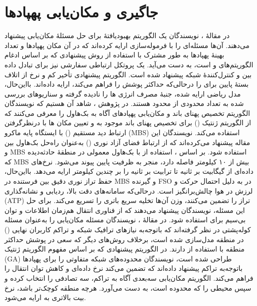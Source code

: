 \section{جاگیری و مکان‌یابی پهپادها}
در مقالهٔ \cite{Pasandideh2023}، نویسندگان یک الگوریتم بهبودیافتهٔ  برای حل مسئلهٔ مکان‌یابی پیشنهاد می‌دهند. آن‌ها مسئله‌ای را با فرموله‌سازی  ارایه کرده‌اند که در آن مکان پهپادها و تعداد بهینهٔ پهپادها به طور مشترک با استفاده از روش پیشنهادی که بر اساس ادغام الگوریتم‌های  و  است، به دست می‌آید. یک پروتکل ارتباطی سفارشی نیز برای تبادل داده بین  و کنترل‌کنندهٔ شبکه پیشنهاد شده است. الگوریتم پیشنهادی تأخیر کم و نرخ از اتلاف بستهٔ پایین برای  را درحالی‌که حداکثر پوشش  را فراهم می‌کند، ارایه داده‌اند. بااین‌حال، مدل ریاضی ارایه شده، جنبهٔ مصرف انرژی ها را نادیده گرفته و سناریوهای بررسی شده به تعداد محدودی از  محدود هستند.
در پژوهش \cite{10004755}، شاهد ‌آن هستیم که نویسندگان الگوریتم تخصیص پهنای باند و مکان‌یابی پهپادهای آگاه به بک‌هاول را معرفی می‌کنند که از الگوریتم ژنتیک () برای تخصیص پهنای باند موجود به  و تعیین مکان ها با درنظرگرفتن ارتباط دید مستقیم () با ایستگاه پایه ماکرو (\gls{MBS}) استفاده می‌کند. نویسندگان این مقاله پیشنهاد می‌کرده‌اند که از ارتباط فضای آزاد نوری () به‌عنوان راه‌حل بک‌هاول بین  و \gls{MBS} استفاده شود. بر اساس \cite{10004755}، استفاده از  با بک‌هاول معمولی در منطقهٔ حادثه‌دیده که \gls{MBS} بیش از ۱۰ کیلومتر فاصله دارد، منجر به ظرفیت پایین پیوند می‌شود.  نرخ‌های داده‌ای از گیگابیت بر ثانیه تا ترابیت بر ثانیه را بر چندین کیلومتر ارایه می‌دهد. بااین‌حال، حفظ تراز نوری دقیق بین فرستنده  در \gls{MBS} و گیرنده \gls{FSO} در  به دلیل احتمال حرکت و لرزش  در هوا چالش‌برانگیز است. درحالی‌که سامانه‌های دقت بالا، ردیابی و نشانه‌گذاری (\gls{ATP}) تراز را تضمین می‌کنند، وزن آن‌ها تخلیه سریع باتری  را تسریع می‌کند. برای حل این مسئله، نویسندگان پیشنهاد می‌دهند که از فناوری انتقال هم‌زمان اطلاعات و توان بی‌سیم برای  استفاده شود.
در مقالهٔ \cite{8642333}، نویسندگان مسئله مکان‌یابی  را به‌عنوان مسئله کوله‌پشتی در نظر گرفته‌اند که باتوجه‌به نیازهای ترافیک شبکه و تراکم کاربران نهایی () در منطقه مدل‌سازی شده است، برخلاف روش‌های دیگر که سعی در پوشش حداکثر منطقه با استفاده از  دارند. در الگوریتم پیشنهادی که بر اساس مفهوم الگوریتم ژنتیک (\gls{GA}) طراحی شده است، نویسندگان محدوده‌های شبکه متفاوتی را برای پهپادها باتوجه‌به تراکم  پیشنهاد داده‌اند که تضمین می‌کند نرخ داده‌ای و کاهش توان انتقال را فراهم می‌کند. الگوریتم مکان‌یابی سه‌بعدی  آگاه به تراکم، سه  تصادفی را انتخاب کرده و سپس محیطی را که محدوده  است، به دست می‌آورد. هرچه منطقه کوچک‌تر باشد، نرخ بیت بالاتری به  ارایه می‌شود.
